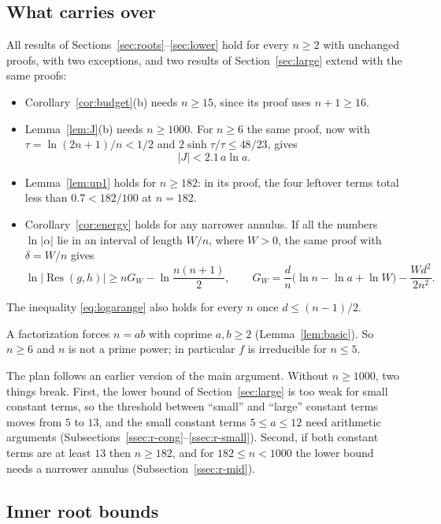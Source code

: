 \documentclass[11pt]{amsart}
\theoremstyle{definition}
\theoremstyle{remark}
\numberwithin{equation}{section}
\newcommand{\Res}{\operatorname{Res}}
\begin{document}
\subsection{What carries over}
All results of Sections~\ref{sec:roots}--\ref{sec:lower} hold for every
$n\ge2$ with unchanged proofs, with two exceptions, and two results of
Section~\ref{sec:large} extend with the same proofs:
\begin{itemize}
\item Corollary~\ref{cor:budget}(b) needs $n\ge15$, since its proof uses
 $n+1\ge16$.
\item Lemma~\ref{lem:J}(b) needs $n\ge1000$. For $n\ge6$ the same proof,
 now with $\tau=\ln(2n+1)/n<1/2$ and $2\sinh\tau/\tau\le48/23$, gives
 \begin{equation}\label{eq:r-J}
  |J|<2.1\,a\ln a .
 \end{equation}
\item Lemma~\ref{lem:up1} holds for $n\ge182$: in its proof, the four
 leftover terms total less than $0.7<182/100$ at $n=182$.
\item Corollary~\ref{cor:energy} holds for any narrower annulus. If all the
 numbers $\ln|\alpha|$ lie in an interval of length $W/n$, where $W>0$,
 the same proof with $\delta=W/n$ gives
 \begin{equation}\label{eq:r-narrow}
  \ln|\Res(g,h)|\ge nG_W-\ln\frac{n(n+1)}2,\qquad
  G_W=\frac dn\bigl(\ln n-\ln a+\ln W\bigr)-\frac{Wd^2}{2n^2}.
 \end{equation}
\end{itemize}
The inequality \eqref{eq:logarange} also holds for every $n$ once
$d\le(n-1)/2$.

A factorization forces $n=ab$ with coprime $a,b\ge2$
(Lemma~\ref{lem:basic}). So $n\ge6$ and $n$ is not a prime power; in
particular $f$ is irreducible for $n\le5$.

The plan follows an earlier version of the main argument. Without
$n\ge1000$, two things break. First, the lower bound of
Section~\ref{sec:large} is too weak for small constant terms, so the
threshold between ``small'' and ``large'' constant terms moves from $5$ to
$13$, and the small constant terms $5\le a\le12$ need arithmetic arguments
(Subsections~\ref{ssec:r-cong}--\ref{ssec:r-small}). Second, if both
constant terms are at least $13$ then $n\ge182$, and for $182\le n<1000$ the
lower bound needs a narrower annulus (Subsection~\ref{ssec:r-mid}).

\subsection{Inner root bounds}
\end{document}
